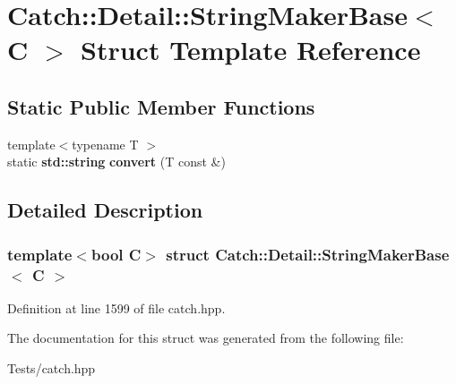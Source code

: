 \hypertarget{struct_catch_1_1_detail_1_1_string_maker_base}{}\section{Catch\+:\+:Detail\+:\+:String\+Maker\+Base$<$ C $>$ Struct Template Reference}
\label{struct_catch_1_1_detail_1_1_string_maker_base}
\subsection*{Static Public Member Functions}
\begin{DoxyCompactItemize}
\item 
\mbox{\label{struct_catch_1_1_detail_1_1_string_maker_base_a8eb9f635dc413a5758e22614bafaf1a3}} 
{\footnotesize template$<$typename T $>$ }\\static \textbf{ std\+::string} {\bfseries convert} (T const \&)
\end{DoxyCompactItemize}


\subsection{Detailed Description}
\subsubsection*{template$<$bool C$>$\newline
struct Catch\+::\+Detail\+::\+String\+Maker\+Base$<$ C $>$}



Definition at line 1599 of file catch.\+hpp.



The documentation for this struct was generated from the following file\+:\begin{DoxyCompactItemize}
\item 
Tests/catch.\+hpp\end{DoxyCompactItemize}
